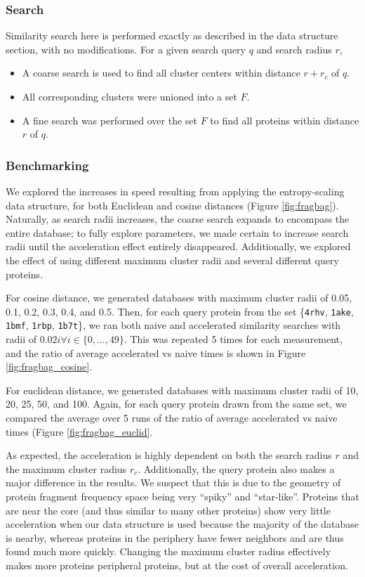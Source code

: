\documentclass[review,preprint,12pt]{elsarticle}
\theoremstyle{definition}
\theoremstyle{remark}
\numberwithin{equation}{section}
\begin{document}
\subsubsection{Search}
Similarity search here is performed exactly as described in the data structure section, with no modifications.
For a given search query $q$ and search radius $r$,
\begin{itemize}
    \item A coarse search is used to find all cluster centers within distance $r+r_c$ of $q$.
    \item All corresponding clusters were unioned into a set $F$.
    \item A fine search was performed over the set $F$ to find all proteins within distance $r$ of $q$.
\end{itemize}

\subsubsection{Benchmarking}
We explored the increases in speed resulting from applying the entropy-scaling data structure, for both Euclidean and cosine distances (Figure \ref{fig:fragbag}).
Naturally, as search radii increases, the coarse search expands to encompass the entire database; to fully explore parameters, we made certain to increase search radii until the acceleration effect entirely disappeared.
Additionally, we explored the effect of using different maximum cluster radii and several different query proteins.

For cosine distance, we generated databases with maximum cluster radii of 0.05, 0.1, 0.2, 0.3, 0.4, and 0.5.
Then, for each query protein from the set \{\texttt{4rhv}, \texttt{1ake}, \texttt{1bmf}, \texttt{1rbp}, \texttt{1b7t}\}, we ran both naive and accelerated similarity searches with radii of $0.02i \forall i \in \{0,\ldots,49\}$.
This was repeated 5 times for each measurement, and the ratio of average accelerated vs naive times is shown in Figure \ref{fig:fragbag_cosine}.

For euclidean distance, we generated databases with maximum cluster radii of 10, 20, 25, 50, and 100.
Again, for each query protein drawn from the same set, we compared the average over 5 runs of the ratio of average accelerated vs naive times (Figure \ref{fig:fragbag_euclid}.

As expected, the acceleration is highly dependent on both the search radius $r$ and the maximum cluster radius $r_c$.
Additionally, the query protein also makes a major difference in the results.
We suspect that this is due to the geometry of protein fragment frequency space being very ``spiky'' and ``star-like''.
Proteins that are near the core (and thus similar to many other proteins) show very little acceleration when our data structure is used because the majority of the database is nearby, whereas proteins in the periphery have fewer neighbors and are thus found much more quickly.
Changing the maximum cluster radius effectively makes more proteins peripheral proteins, but at the cost of overall acceleration.
\end{document}
